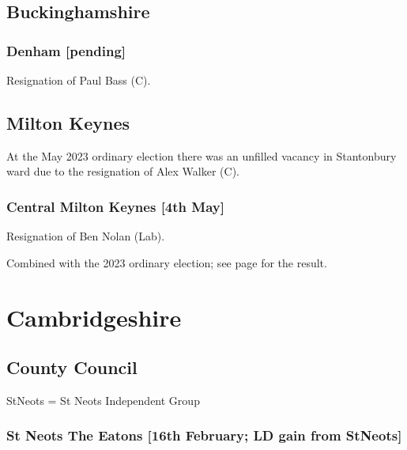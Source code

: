 \documentclass[a4paper,openany]{book}
\begin{document}
\begin{resultsiii}
\subsection*{Buckinghamshire}

\subsubsection*{Denham \hspace*{\fill}\nolinebreak[1]%
	\enspace\hspace*{\fill}
	[pending]}


Resignation of Paul Bass (C).

\subsection*{Milton Keynes}

At the May 2023 ordinary election there was an unfilled vacancy in Stantonbury ward due to the resignation of Alex Walker (C).%

\subsubsection*{Central Milton Keynes \hspace*{\fill}\nolinebreak[1]%
	\enspace\hspace*{\fill}
	[4th May]}


Resignation of Ben Nolan (Lab).

Combined with the 2023 ordinary election; see page \pageref{MiltonKeynesCentralMiltonKeynes} for the result.

\section{Cambridgeshire}

\subsection*{County Council}

StNeots = St Neots Independent Group

\subsubsection*{St Neots The Eatons \hspace*{\fill}\nolinebreak[1]%
	\enspace\hspace*{\fill}
	[16th February; LD gain from StNeots]}


\end{resultsiii}
\end{document}
